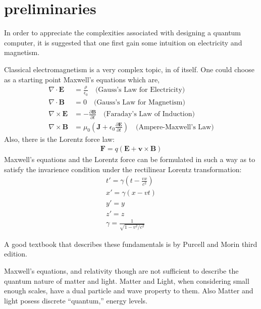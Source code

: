 \documentclass[]{article}
\begin{document}
\section{preliminaries}
In order to appreciate the complexities associated with designing a quantum computer, it is suggested that one first gain some intuition on electricity and magnetism.
\par\noindent
Classical electromagnetism is a very complex topic, in of itself.  One could choose as a starting point Maxwell's equations which are,
\begin{align}
    \label{eq:gauss_law_e}
    \nabla \cdot \mathbf{E} &= \frac{\rho}{\epsilon_0} \quad \text{(Gauss's Law for Electricity)} \\
    \label{eq:gauss_law_m}
    \nabla \cdot \mathbf{B} &= 0 \quad \text{(Gauss's Law for Magnetism)} \\
    \label{eq:faraday_law}
    \nabla \times \mathbf{E} &= -\frac{\partial \mathbf{B}}{\partial t} \quad \text{(Faraday's Law of Induction)} \\
    \label{eq:ampere_maxwell_law}
    \nabla \times \mathbf{B} &= \mu_0 \left( \mathbf{J} + \epsilon_0 \frac{\partial \mathbf{E}}{\partial t} \right) \quad \text{(Ampere-Maxwell's Law)}
\end{align}
Also, there is the Lorentz force law:
\begin{eqnarray*}
\textbf{F} = q(\textbf{E} + \textbf{v} \times \textbf{B})
\end{eqnarray*}
Maxwell's equations and the Lorentz force can be formulated in such a way as to satisfy the invarience condition under the rectilinear Lorentz transformation:
\begin{eqnarray*}
t'=\gamma(t-\frac{vx}{c^{2}}) \\
x'=\gamma(x-vt) \\
y'=y \\
z'=z \\
\gamma=\frac{1}{\sqrt{1-v^{2}/c^{2}}}
\end{eqnarray*}
\par\noindent
A good textbook that describes these fundamentals is by Purcell and Morin third edition\cite{purcell2013electricity}.
\par\noindent
Maxwell's equations, and relativity though are not sufficient to describe the
quantum nature of matter and light.  Matter and Light, when considering
small enough scales, have a dual particle and wave property to them.  Also
Matter and light posess discrete ``quantum,'' energy levels.
\end{document}
